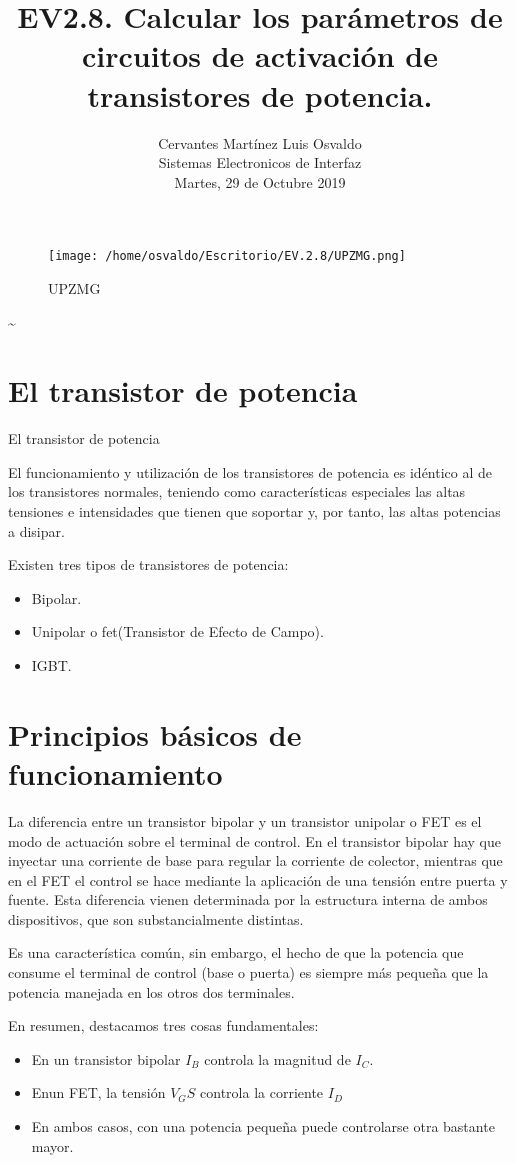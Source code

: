 \documentclass[11pt]{article}
\title{\textbf{EV2.8. Calcular los par\'ametros de circuitos de activaci\'on de transistores de potencia.}}
\author{Cervantes Mart\'inez Luis Osvaldo\\
		Sistemas Electronicos de Interfaz\\
		Martes, 29 de Octubre 2019}
\date{}
\begin{document}
\maketitle
\begin{figure}[htp]
\centering
\texttt{[image: /home/osvaldo/Escritorio/EV.2.8/UPZMG.png]}
\caption{UPZMG}
\label{}
\end{figure}
\~
\pagebreak
\section{El transistor de potencia}

El transistor de potencia

El funcionamiento y utilización de los transistores de potencia es idéntico al de los transistores normales, teniendo como características especiales las altas tensiones e intensidades que tienen que soportar y, por tanto, las altas potencias a disipar.

Existen tres tipos de transistores de potencia: 
\begin{itemize}
\item Bipolar.           
\item Unipolar o fet(Transistor de Efecto de Campo).
\item IGBT.
\end{itemize}

\section{Principios b\'asicos de funcionamiento}
La diferencia entre un transistor bipolar y un transistor unipolar o FET es el modo de actuaci\'on sobre el terminal de control. En el transistor bipolar hay que inyectar una corriente de base para regular la corriente de colector, mientras que en el FET el control se hace mediante la aplicaci\'on de una tensi\'on entre puerta y fuente. Esta diferencia vienen determinada por la estructura interna de ambos dispositivos, que son substancialmente distintas.

Es una caracter\'istica com\'un, sin embargo, el hecho de que la potencia que consume el terminal de control (base o puerta) es siempre m\'as peque\~na que la potencia manejada en los otros dos terminales.

En resumen, destacamos tres cosas fundamentales: 
\begin{itemize}
\item En un transistor bipolar $I_B$ controla la magnitud de $I_C$.           
\item Enun FET, la tensi\'on $V_GS$ controla la corriente $I_D$ 
\item En ambos casos, con una potencia peque\~na puede controlarse otra bastante mayor.
\end{itemize}
\end{document}
